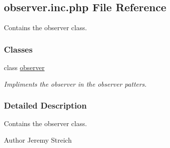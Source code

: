 \hypertarget{observer_8inc_8php}{\subsection{observer.\-inc.\-php File Reference}
\label{observer_8inc_8php}
}


Contains the observer class.  


\subsubsection*{Classes}
\begin{DoxyCompactItemize}
\item 
class \hyperlink{classobserver}{observer}
\begin{DoxyCompactList}\small\item\em Impliments the observer in the observer patters. \end{DoxyCompactList}\end{DoxyCompactItemize}


\subsubsection{Detailed Description}
Contains the observer class. \begin{DoxyAuthor}{Author}
Jeremy Streich 
\end{DoxyAuthor}
